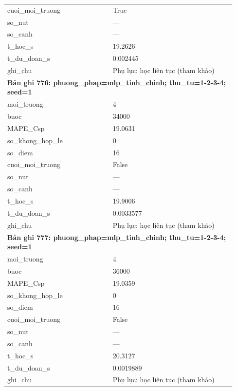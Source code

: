 \begin{longtable}{p{0.43\linewidth}p{0.50\linewidth}}
cuoi\_\allowbreak moi\_\allowbreak truong & True \\
so\_\allowbreak nut & — \\
so\_\allowbreak canh & — \\
t\_\allowbreak hoc\_\allowbreak s & 19.2626 \\
t\_\allowbreak du\_\allowbreak doan\_\allowbreak s & 0.002445 \\
ghi\_\allowbreak chu & Phụ lục: học liên tục (tham khảo) \\
\midrule
\multicolumn{2}{p{0.95\linewidth}}{\textbf{Bản ghi 776: phuong\_phap=mlp\_tinh\_chinh; thu\_tu=1-2-3-4; seed=1}} \\
moi\_\allowbreak truong & 4 \\
buoc & 34000 \\
MAPE\_\allowbreak Csp & 19.0631 \\
so\_\allowbreak khong\_\allowbreak hop\_\allowbreak le & 0 \\
so\_\allowbreak diem & 16 \\
cuoi\_\allowbreak moi\_\allowbreak truong & False \\
so\_\allowbreak nut & — \\
so\_\allowbreak canh & — \\
t\_\allowbreak hoc\_\allowbreak s & 19.9006 \\
t\_\allowbreak du\_\allowbreak doan\_\allowbreak s & 0.0033577 \\
ghi\_\allowbreak chu & Phụ lục: học liên tục (tham khảo) \\
\midrule
\multicolumn{2}{p{0.95\linewidth}}{\textbf{Bản ghi 777: phuong\_phap=mlp\_tinh\_chinh; thu\_tu=1-2-3-4; seed=1}} \\
moi\_\allowbreak truong & 4 \\
buoc & 36000 \\
MAPE\_\allowbreak Csp & 19.0359 \\
so\_\allowbreak khong\_\allowbreak hop\_\allowbreak le & 0 \\
so\_\allowbreak diem & 16 \\
cuoi\_\allowbreak moi\_\allowbreak truong & False \\
so\_\allowbreak nut & — \\
so\_\allowbreak canh & — \\
t\_\allowbreak hoc\_\allowbreak s & 20.3127 \\
t\_\allowbreak du\_\allowbreak doan\_\allowbreak s & 0.0019889 \\
ghi\_\allowbreak chu & Phụ lục: học liên tục (tham khảo) \\

\end{longtable}
